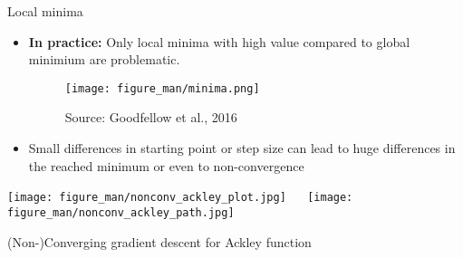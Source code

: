 \documentclass[11pt,compress,t,notes=noshow, xcolor=table]{beamer}
\begin{document}
\begin{vbframe} {Local minima}

\begin{itemize}
\item \textbf{In practice:} Only local minima with high value compared to global minimium are problematic.
\begin{figure}
    \centering
	\texttt{[image: figure\_man/minima.png]}
    \caption*{\footnotesize Source: Goodfellow et al., 2016}
\end{figure}
\end{itemize}

\framebreak

\begin{itemize}
    \item Small differences in starting point or step size can lead to huge differences in the reached minimum or even to non-convergence
\end{itemize}

\vspace{\baselineskip}

\texttt{[image: figure\_man/nonconv\_ackley\_plot.jpg]} ~~
\texttt{[image: figure\_man/nonconv\_ackley\_path.jpg]}

\begin{center}
    \small
    (Non-)Converging gradient descent for Ackley function
\end{center}

\end{vbframe}

\end{document}
